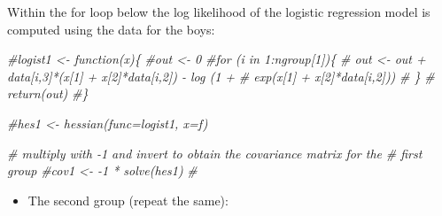 \documentclass[
]{book}
\newenvironment{Shaded}{\begin{snugshade}}{\end{snugshade}}
\newcommand{\CommentTok}[1]{\textcolor[rgb]{0.56,0.35,0.01}{\textit{#1}}}
\newcommand{\DecValTok}[1]{\textcolor[rgb]{0.00,0.00,0.81}{#1}}
\newcommand{\FunctionTok}[1]{\textcolor[rgb]{0.00,0.00,0.00}{#1}}
\newcommand{\NormalTok}[1]{#1}
\newcommand{\OtherTok}[1]{\textcolor[rgb]{0.56,0.35,0.01}{#1}}
\newcommand{\SpecialCharTok}[1]{\textcolor[rgb]{0.00,0.00,0.00}{#1}}
\providecommand{\tightlist}{%
  \setlength{\itemsep}{0pt}\setlength{\parskip}{0pt}}
\begin{document}
\begin{Shaded}
\end{Shaded}

Within the for loop below the log likelihood of the logistic regression model is computed using the data for the boys:

\begin{Shaded}
\begin{Highlighting}[]
\CommentTok{\#logist1 \textless{}{-} function(x)\{}
  \CommentTok{\#out \textless{}{-} 0}
  \CommentTok{\#for (i in 1:ngroup[1])\{}
   \CommentTok{\# out \textless{}{-} out + data[i,3]*(x[1] + x[2]*data[i,2]) {-} log (1 +}
   \CommentTok{\# exp(x[1] + x[2]*data[i,2]))}
 \CommentTok{\# \}}
 \CommentTok{\# return(out)}
\CommentTok{\#\}}

\CommentTok{\#hes1 \textless{}{-} hessian(func=logist1, x=f)}

\CommentTok{\# multiply with {-}1 and invert to obtain the covariance matrix for the}
\CommentTok{\# first group}
\CommentTok{\#cov1 \textless{}{-} {-}1 * solve(hes1)}
\CommentTok{\#}
\end{Highlighting}
\end{Shaded}

\begin{itemize}
\tightlist
\item
  The second group (repeat the same):
\end{itemize}

\begin{Shaded}
\end{Shaded}
\end{document}
